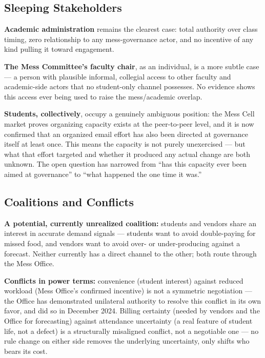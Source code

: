 \documentclass[11pt]{article}
\begin{document}
\subsection{Sleeping Stakeholders}

\textbf{Academic administration} remains the clearest case: total authority over
class timing, zero relationship to any mess-governance actor, and no incentive of any
kind pulling it toward engagement.

\textbf{The Mess Committee's faculty chair}, as an individual, is a more subtle case
--- a person with plausible informal, collegial access to other faculty and
academic-side actors that no student-only channel possesses. No evidence shows this
access ever being used to raise the mess/academic overlap.

\textbf{Students, collectively}, occupy a genuinely ambiguous position: the Mess Cell
market proves organizing capacity exists at the peer-to-peer level, and it is now
confirmed that an organized email effort has also been directed at governance itself
at least once. This means the capacity is not purely unexercised --- but what that
effort targeted and whether it produced any actual change are both unknown. The open
question has narrowed from ``has this capacity ever been aimed at governance'' to
``what happened the one time it was.''

\subsection{Coalitions and Conflicts}

\textbf{A potential, currently unrealized coalition:} students and vendors share an
interest in accurate demand signals --- students want to avoid double-paying for
missed food, and vendors want to avoid over- or under-producing against a forecast.
Neither currently has a direct channel to the other; both route through the Mess
Office.

\textbf{Conflicts in power terms:} convenience (student interest) against reduced
workload (Mess Office's confirmed incentive) is not a symmetric negotiation --- the
Office has demonstrated unilateral authority to resolve this conflict in its own
favor, and did so in December 2024. Billing certainty (needed by vendors and the
Office for forecasting) against attendance uncertainty (a real feature of student
life, not a defect) is a structurally misaligned conflict, not a negotiable one --- no
rule change on either side removes the underlying uncertainty, only shifts who bears
its cost.
\end{document}
